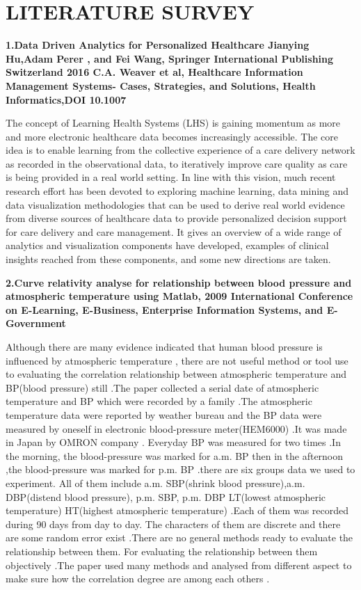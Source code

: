 \documentclass[12pt,a4paper]{report}
\begin{document}
\section{LITERATURE SURVEY}
\textbf{1.Data Driven Analytics for Personalized Healthcare Jianying Hu,Adam Perer , and Fei Wang, Springer International Publishing Switzerland 2016 C.A. Weaver et al, Healthcare Information Management Systems- Cases, Strategies, and Solutions, Health Informatics,DOI 10.1007}

The concept of Learning Health Systems (LHS) is gaining momentum as
more and more electronic healthcare data becomes increasingly accessible. The core
idea is to enable learning from the collective experience of a care delivery network
as recorded in the observational data, to iteratively improve care quality as care is
being provided in a real world setting. In line with this vision, much recent research
effort has been devoted to exploring machine learning, data mining and data visualization methodologies that can be used to derive real world evidence from diverse
sources of healthcare data to provide personalized decision support for care delivery
and care management. It gives an overview of a wide range of
analytics and visualization components  have developed, examples of clinical
insights reached from these components, and some new directions are taken.

\textbf{2.Curve relativity analyse for relationship between blood pressure and atmospheric
temperature using Matlab, 2009 International Conference on E-Learning, E-Business, Enterprise Information Systems, and E-Government}
	
Although there are many evidence indicated that human
blood pressure is influenced by atmospheric temperature ,
there are not useful method or tool use to evaluating the
correlation relationship between atmospheric temperature
and BP(blood pressure) still .The paper collected a serial
date of atmospheric temperature and BP which were
recorded by a family .The atmospheric temperature data
were reported by weather bureau and the BP data were
measured by oneself in electronic blood-pressure
meter(HEM6000) .It was made in Japan by OMRON
company . Everyday BP was measured for two times .In the
morning, the blood-pressure was marked for a.m. BP then in
the afternoon ,the blood-pressure was marked for p.m. BP
.there are six groups data we used to experiment. All of them
include a.m. SBP(shrink blood pressure),a.m. DBP(distend
blood pressure), p.m. SBP, p.m. DBP LT(lowest atmospheric
temperature) HT(highest atmospheric temperature) .Each of
them was recorded during 90 days from day to day. The
characters of them are discrete and there are some random
error exist .There are no general methods ready to evaluate
the relationship between them. For evaluating the
relationship between them objectively .The paper used many
methods and analysed from different aspect to make sure
how the correlation degree are among each others 
.
\end{document}
